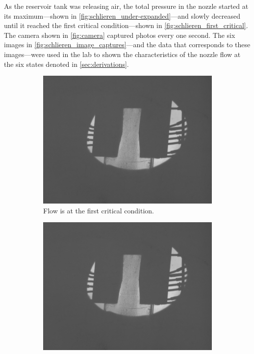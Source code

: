 As the reservoir tank was releasing air, the total pressure in the nozzle started at its maximum—shown in \autoref{fig:schlieren_under-expanded}—and slowly decreased until it reached the first critical condition—shown in \autoref{fig:schlieren_first_critical}. The camera shown in \autoref{fig:camera} captured photos every one second. The six images in \autoref{fig:schlieren_image_captures}—and the data that corresponds to these images—were used in the lab to shown the characteristics of the nozzle flow at the six states denoted in \autoref{sec:derivations}.

\begin{figure}[htpb]
    \centering
    \begin{subfigure}{0.47\textwidth}
        \centering
        \includegraphics[width=\textwidth]{Figures/6-1st_critical_condition.png}
        \caption{Flow is at the first critical condition.}
        \label{fig:schlieren_first_critical}
    \end{subfigure}
    \begin{subfigure}{0.47\textwidth}
        \centering
        \includegraphics[width=\textwidth]{Figures/5-normal_shock_inside.png}

\end{subfigure}
\end{figure}
